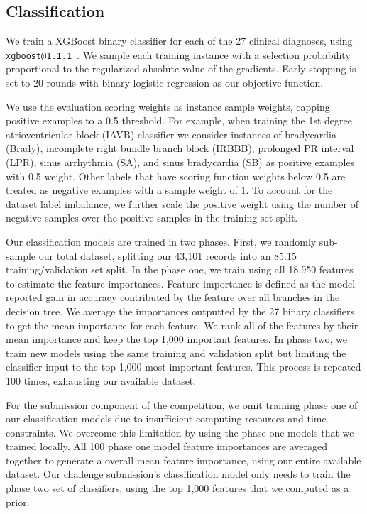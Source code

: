 \documentclass[twocolumn]{cinc}
\begin{document}
\subsection{Classification}

We train a XGBoost binary classifier for each of the 27 clinical diagnoses, using \texttt{xgboost@1.1.1}~\cite{chen_xgboost_2016}.
We sample each training instance with a selection probability proportional to the regularized absolute value of the gradients.
Early stopping is set to 20 rounds with binary logistic regression as our objective function.

We use the evaluation scoring weights as instance sample weights, capping positive examples to a 0.5 threshold.
For example, when training the 1st degree atrioventricular block (IAVB) classifier we consider instances of bradycardia (Brady), incomplete right bundle branch block (IRBBB), prolonged PR interval (LPR), sinus arrhythmia (SA), and sinus bradycardia (SB) as positive examples with 0.5 weight.
Other labels that have scoring function weights below 0.5 are treated as negative examples with a sample weight of 1.
To account for the dataset label imbalance, we further scale the positive weight using the number of negative samples over the positive samples in the training set split.

Our classification models are trained in two phases.
First, we randomly sub-sample our total dataset, splitting our 43,101 records into an 85:15 training/validation set split.
In the phase one, we train using all 18,950 features to estimate the feature importances.
Feature importance is defined as the model reported gain in accuracy contributed by the feature over all branches in the decision tree.
We average the importances outputted by the 27 binary classifiers to get the mean importance for each feature.
We rank all of the features by their mean importance and keep the top 1,000 important features.
In phase two, we train new models using the same training and validation split but limiting the classifier input to the top 1,000 most important features.
This process is repeated 100 times, exhausting our available dataset.

For the submission component of the competition, we omit training phase one of our classification models due to insufficient computing resources and time constraints.
We overcome this limitation by using the phase one models that we trained locally.
All 100 phase one model feature importances are averaged together to generate a overall mean feature importance, using our entire available dataset.
Our challenge submission's classification model only needs to train the phase two set of classifiers, using the top 1,000 features that we computed as a prior.
\end{document}
